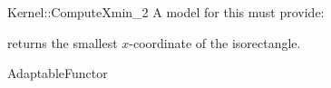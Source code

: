 \begin{ccRefFunctionObjectConcept}{Kernel::ComputeXmin_2}
A model for this must provide:


       {returns the smallest $x$-coordinate of the isorectangle.}


\ccRefines
AdaptableFunctor



\end{ccRefFunctionObjectConcept}
